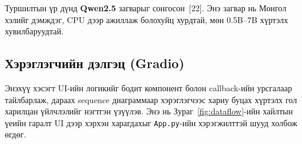 \documentclass[11pt,a4paper]{article}
\begin{document}
Туршилтын үр дүнд \textbf{Qwen2.5} загварыг сонгосон~[22]. Энэ загвар нь Монгол хэлийг дэмждэг, CPU дээр ажиллаж болохуйц хурдтай, мөн 0.5B--7B хүртэлх хувилбаруудтай.

\subsection{Хэрэглэгчийн дэлгэц (Gradio)}

Энэхүү хэсэгт UI-ийн логикийг бодит компонент болон callback-ийн урсгалаар тайлбарлаж, дараах sequence диаграммаар хэрэглэгчээс хариу буцах хүртэлх гол харилцан үйлчлэлийг нэгтгэн үзүүлэв. Энэ нь Зураг~\ref{fig:dataflow}-ийн хайлтын үеийн гаралт UI дээр хэрхэн харагдахыг \texttt{App.py}-ийн хэрэгжилттэй шууд холбож өгдөг.
\end{document}
